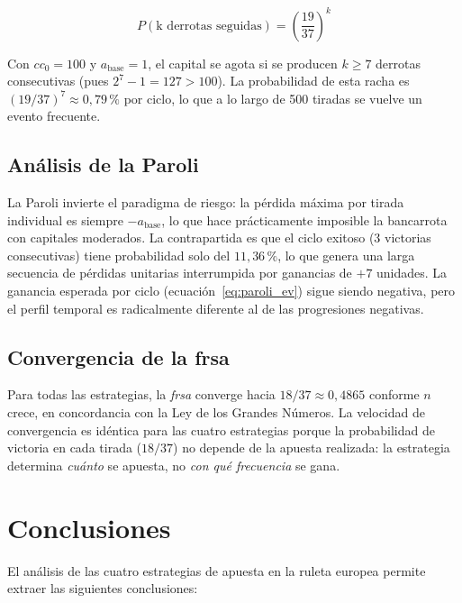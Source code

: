 \documentclass[a4paper, 11pt]{article}
\begin{document}
\begin{equation}
  P(\text{k derrotas seguidas}) = \left(\frac{19}{37}\right)^k
  \label{eq:racha_derrotas}
\end{equation}

Con $cc_0 = 100$ y $a_{\text{base}} = 1$, el capital se agota si se
producen $k \geq 7$ derrotas consecutivas (pues $2^7 - 1 = 127 > 100$).
La probabilidad de esta racha es $(19/37)^7 \approx 0{,}79\,\%$ por ciclo,
lo que a lo largo de 500 tiradas se vuelve un evento frecuente.

\subsection{Análisis de la Paroli}

La Paroli invierte el paradigma de riesgo: la pérdida máxima por tirada
individual es siempre $-a_{\text{base}}$, lo que hace prácticamente
imposible la bancarrota con capitales moderados. La contrapartida es que
el ciclo exitoso (3 victorias consecutivas) tiene probabilidad solo del
$11{,}36\,\%$, lo que genera una larga secuencia de pérdidas unitarias
interrumpida por ganancias de $+7$ unidades. La ganancia esperada por
ciclo (ecuación~\ref{eq:paroli_ev}) sigue siendo negativa, pero el perfil
temporal es radicalmente diferente al de las progresiones negativas.

\subsection{Convergencia de la frsa}

Para todas las estrategias, la \textit{frsa} converge hacia $18/37 \approx
0{,}4865$ conforme $n$ crece, en concordancia con la Ley de los Grandes
Números. La velocidad de convergencia es idéntica para las cuatro estrategias
porque la probabilidad de victoria en cada tirada ($18/37$) no depende de
la apuesta realizada: la estrategia determina \textit{cuánto} se apuesta,
no \textit{con qué frecuencia} se gana.

\section{Conclusiones}

El análisis de las cuatro estrategias de apuesta en la ruleta europea
permite extraer las siguientes conclusiones:
\end{document}
